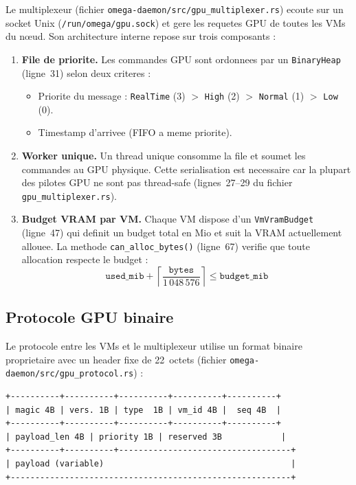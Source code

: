 Le multiplexeur (fichier \texttt{omega-daemon/src/gpu\_multiplexer.rs}) ecoute sur un socket Unix (\texttt{/run/omega/gpu.sock}) et gere les requetes GPU de toutes les VMs du n\oe{}ud. Son architecture interne repose sur trois composants :

\begin{enumerate}
    \item \textbf{File de priorite.} Les commandes GPU sont ordonnees par un \texttt{BinaryHeap} (ligne~31) selon deux criteres :
    \begin{itemize}
        \item Priorite du message : \texttt{RealTime} (3) $>$ \texttt{High} (2) $>$ \texttt{Normal} (1) $>$ \texttt{Low} (0).
        \item Timestamp d'arrivee (FIFO a meme priorite).
    \end{itemize}

    \item \textbf{Worker unique.} Un thread unique consomme la file et soumet les commandes au GPU physique. Cette serialisation est necessaire car la plupart des pilotes GPU ne sont pas thread-safe (lignes~27--29 du fichier \texttt{gpu\_multiplexer.rs}).

    \item \textbf{Budget VRAM par VM.} Chaque VM dispose d'un \texttt{VmVramBudget} (ligne~47) qui definit un budget total en Mio et suit la VRAM actuellement allouee. La methode \texttt{can\_alloc\_bytes()} (ligne~67) verifie que toute allocation respecte le budget :
    \begin{equation}
        \texttt{used\_mib} + \left\lceil\frac{\texttt{bytes}}{1\,048\,576}\right\rceil \leq \texttt{budget\_mib}
    \end{equation}
\end{enumerate}

\subsection{Protocole GPU binaire}
\label{subsec:protocole-gpu}

Le protocole entre les VMs et le multiplexeur utilise un format binaire proprietaire avec un header fixe de 22~octets (fichier \texttt{omega-daemon/src/gpu\_protocol.rs}) :

\begin{verbatim}
+----------+----------+----------+----------+----------+
| magic 4B | vers. 1B | type  1B | vm_id 4B |  seq 4B  |
+----------+----------+----------+----------+----------+
| payload_len 4B | priority 1B | reserved 3B            |
+----------+----------+-----------------------------------+
| payload (variable)                                      |
+---------------------------------------------------------+
\end{verbatim}

